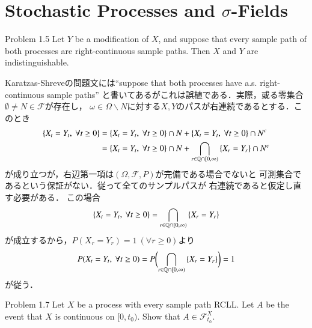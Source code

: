 \section{Stochastic Processes and $\sigma$-Fields}
\begin{itembox}[l]{Problem 1.5}
	Let $Y$ be a modification of $X$, and suppose that every 
	sample path of both processes are right-continuous sample paths. 
	Then $X$ and $Y$ are indistinguishable.
\end{itembox}

\begin{prf}
	Karatzas-Shreveの問題文には``suppose that both processes have a.s. right-continuous sample paths''
	と書いてあるがこれは誤植である．実際，或る零集合$\emptyset \neq N \in \mathscr{F}$が存在し，
	$\omega \in \Omega \backslash N$に対する$X,Y$のパスが右連続であるとする．このとき
	\begin{align}
		\left\{ X_t = Y_t,\ \forall t \geq 0 \right\}
		&= \left\{ X_t = Y_t,\ \forall t \geq 0 \right\} \cap N
			+ \left\{ X_t = Y_t,\ \forall t \geq 0 \right\} \cap N^c \\
		&= \left\{ X_t = Y_t,\ \forall t \geq 0 \right\} \cap N
			+ \bigcap_{r \in \mathbb{Q} \cap [0,\infty)} \left\{ X_r = Y_r \right\} \cap N^c
	\end{align}
	が成り立つが，右辺第一項は$(\Omega,\mathscr{F},P)$が完備である場合でないと
	可測集合であるという保証がない．従って全てのサンプルパスが
	右連続であると仮定し直す必要がある．
	この場合
	\begin{align}
		\left\{ X_t = Y_t,\ \forall t \geq 0 \right\}
		= \bigcap_{r \in \mathbb{Q} \cap [0,\infty)} \left\{ X_r = Y_r \right\}
	\end{align}
	が成立するから，$P(X_r = Y_r) = 1\   (\forall r \geq 0)$より
	\begin{align}
		P(X_t = Y_t,\ \forall t \geq 0)
		= P \biggl( \bigcap_{r \in \mathbb{Q} \cap [0,\infty)} \left\{ X_r = Y_r \right\} \biggr)
		= 1
	\end{align}
	が従う．
	\QED
\end{prf}

\begin{itembox}[l]{Problem 1.7}
		Let $X$ be a process with every sample path RCLL. 
		Let $A$ be the event that $X$ is continuous on $[0,t_0)$. 
		Show that $A \in \mathscr{F}^X_{t_0}$.
\end{itembox}

